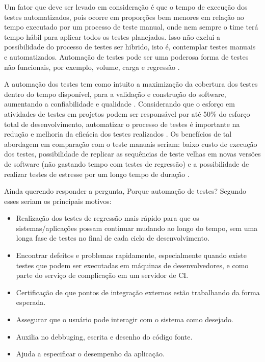 Um fator que deve ser levado em consideração é que o tempo de execução dos testes automatizados, pois ocorre em proporções bem menores em relação ao tempo executado por um processo de teste manual, onde nem sempre o time terá tempo hábil para aplicar todos os testes planejados. Isso não exclui a possibilidade do processo de testes ser hibrido, isto é, contemplar testes manuais e automatizados. Automação de testes pode ser uma poderosa forma de testes não funcionais, por exemplo, volume, carga e regressão \cite{Bret1999}.

A automação dos testes tem como intuito a maximização da cobertura dos testes dentro do tempo disponível, para a validação e construção do software, aumentando a confiabilidade e qualidade \cite{Wissink206}. Considerando que o esforço em atividades de testes em projetos podem ser responsável por até 50\% do esforço total de desenvolvimento, automatizar o processo de testes é importante na redução e melhoria da eficácia dos testes realizados \cite{Budnik2010}. Os benefícios de tal abordagem em comparação com o teste manuais seriam: baixo custo de execução dos testes, possibilidade de replicar as sequências de teste velhas em novas versões de software (não gastando tempo com testes de regressão) e a possibilidade de realizar testes de estresse por um longo tempo de duração \cite{Wissink206}.

Ainda querendo responder a pergunta, Porque automação de testes? Segundo \cite{James2012} esses seriam os principais motivos:
\begin{itemize}
	\item Realização dos testes de regressão mais rápido para que os sistemas/aplicações possam continuar mudando ao longo do tempo, sem uma longa fase de testes no final de cada ciclo de desenvolvimento.
	\item Encontrar defeitos e problemas rapidamente, especialmente quando existe testes que podem ser executadas em máquinas de desenvolvedores, e como parte do serviço de complicação em um servidor de CI.
	\item Certificação de que pontos de integração externos estão trabalhando da forma esperada.
	\item Assegurar que o usuário pode interagir com o sistema como desejado.
	\item Auxilia no debbuging, escrita e desenho do código fonte.
	\item Ajuda a especificar o desempenho da aplicação.
\end{itemize}

